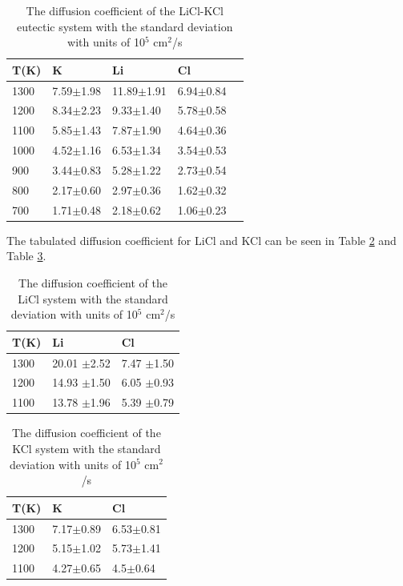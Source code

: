 \documentclass[review]{elsarticle}
\begin{document}
\begin{table}[h]
\centering
\caption{The diffusion coefficient of the LiCl-KCl eutectic system with the standard deviation with units of 10$^5$ cm$^2$/s }
\begin{tabular}{lllll}
\hline
T(K) & K           & Li          & Cl          &  \\
\hline
1300 & 7.59$\pm$1.98 & 11.89$\pm$1.91 & 6.94$\pm$0.84 &  \\
1200 & 8.34$\pm$2.23 & 9.33$\pm$1.40  & 5.78$\pm$0.58 &  \\
1100 & 5.85$\pm$1.43 & 7.87$\pm$1.90  & 4.64$\pm$0.36 &  \\
1000 & 4.52$\pm$1.16 & 6.53$\pm$1.34  & 3.54$\pm$0.53 &  \\
900  & 3.44$\pm$0.83 & 5.28$\pm$1.22  & 2.73$\pm$0.54 &  \\
800  & 2.17$\pm$0.60 & 2.97$\pm$0.36  & 1.62$\pm$0.32 &  \\
700  & 1.71$\pm$0.48 & 2.18$\pm$0.62  & 1.06$\pm$0.23  \\
\hline
\end{tabular}
\label{Table: licl-kcl-eut diffusion}
\end{table}
\FloatBarrier

The tabulated diffusion coefficient for LiCl and KCl can be seen in Table \ref{Table: licl diffusion} and Table \ref{Table: kcl diffusion}.

\begin{table}[h]
\centering
\caption{The diffusion coefficient of the LiCl system with the standard deviation with units of 10$^5$ cm$^2$/s }
\begin{tabular}{lll}
\hline
T(K) & Li           & Cl        \\
\hline
1300 & 20.01 $\pm$2.52 & 7.47 $\pm$1.50  \\
1200 & 14.93 $\pm$1.50  & 6.05 $\pm$0.93 \\
1100 & 13.78 $\pm$1.96& 5.39 $\pm$0.79 \\
\hline
\end{tabular}
\label{Table: licl diffusion}
\end{table}


\begin{table}[h]
\centering
\caption{The diffusion coefficient of the KCl system with the standard deviation with units of 10$^5$ cm$^2$/s }
\begin{tabular}{lll}
\hline
T(K) & K         & Cl        \\
\hline
1300 & 7.17$\pm$0.89 & 6.53$\pm$0.81 \\
1200 & 5.15$\pm$1.02 & 5.73$\pm$1.41 \\
1100 & 4.27$\pm$0.65 & 4.5$\pm$0.64 \\
\hline
\end{tabular}
\label{Table: kcl diffusion}
\end{table}
\FloatBarrier
\end{document}
